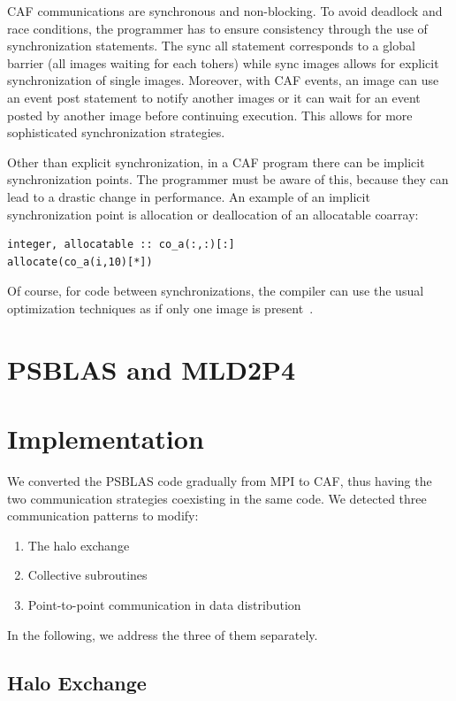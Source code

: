 \documentclass{IOS-Book-Article}
\begin{document}
CAF communications are synchronous and non-blocking. 
To avoid deadlock and race conditions, the programmer has to ensure consistency through the use of synchronization statements.
The sync all statement corresponds to a global barrier (all images waiting for each tohers) while sync images allows for explicit synchronization of single images. Moreover, with CAF events, an image can use an event post statement to notify another images or it can wait for an event posted by another image before continuing execution. This allows for more sophisticated synchronization strategies.  

Other than explicit synchronization, in a CAF program there can be implicit synchronization points. The programmer must be aware of this, because they can lead to a drastic change in performance.
An example of an implicit synchronization point is allocation or deallocation of an allocatable coarray:

\begin{lstlisting}
integer, allocatable :: co_a(:,:)[:]
allocate(co_a(i,10)[*])
\end{lstlisting}

Of course, for code between synchronizations, the compiler can use the usual optimization techniques as if only one image is present~\cite{CAF}.

\section{PSBLAS and MLD2P4}

\section{Implementation}
We converted the PSBLAS code gradually from MPI to CAF, thus having the two communication strategies coexisting in the same code. 
We detected three communication patterns to modify:

\begin{enumerate}
\item The halo exchange
\item Collective subroutines
\item Point-to-point communication in data distribution
\end{enumerate}

In the following, we address the three of them separately.

\subsection{Halo Exchange}
\end{document}
